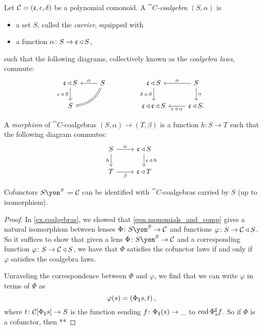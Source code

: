 \documentclass[Book-Poly]{subfiles}
\begin{document}
\begin{definition}\label{def.coalgebra}
Let $\mathcal{C}=(\mathfrak{c},\epsilon,\delta)$ be a polynomial comonoid.
A \emph{$\cat{C}$-coalgebra} $(S,\alpha)$ is
\begin{itemize}
    \item a set $S$, called the \emph{carrier}, equipped with
    \item a function $\alpha\colon S\to\mathfrak{c}\mathbin{\triangleleft} S$,
\end{itemize}
such that the following diagrams, collectively known as the \emph{coalgebra laws}, commute:
\begin{equation} \label{eqn.coalg_laws}
\begin{tikzcd}
	\car{c}\tri S\ar[d, "\epsilon\:\tri\:S"']&
	S\ar[l, "\alpha"']\ar[dl, equal, bend left]\\
	S
\end{tikzcd}
\hspace{.6in}
\begin{tikzcd}
	\car{c}\tri S\ar[d, "\delta\:\tri\:S"']&
	S\ar[l, "\alpha"']\ar[d, "\alpha"]\\
	\car{c}\tri\car{c}\tri S&
	\car{c}\tri S.\ar[l, "\car{c}\:\tri\:\alpha"]
\end{tikzcd}
\end{equation}

A \emph{morphism} of $\cat{C}$-coalgebras $(S,\alpha)\to(T,\beta)$ is a function $h\colon S\to T$ such that the following diagram commutes:
\[
\begin{tikzcd}
    S \ar[d, "h"'] \ar[r, "\alpha"] &
    \car{c}\tri S \ar[d, "\car{c}\:\tri\:h"] \\
    T \ar[r, "\beta"'] &
    \car{c}\tri T
\end{tikzcd}
\]
\end{definition}


\begin{proposition}
Cofunctors $S\yon^S\cof\cat{C}$ can be identified with $\cat{C}$-coalgebras carried by $S$ (up to isomorphism).
\end{proposition}
\begin{proof}
In \cref{ex.coalgebras}, we showed that \eqref{eqn.monomials_and_comp} gives a natural isomorphism between lenses $\Phi\colon S\yon^S\to\cat{C}$ and functions $\varphi\colon S\to\mathcal{C}\mathbin{\triangleleft} S$.
So it suffices to show that given a lens $\Phi\colon S\yon^S\to\cat{C}$ and a corresponding function $\varphi\colon S\to\mathcal{C}\mathbin{\triangleleft} S$, we have that $\Phi$ satisfies the cofunctor laws if and only if $\varphi$ satisfies the coalgebra laws.

Unraveling the correspondence between $\Phi$ and $\varphi$, we find that we can write $\varphi$ in terms of $\Phi$ as
\[
    \varphi(s)=\left(\Phi_{\textsf{1}} s, t\right),
\]
where $t\colon\mathcal{C}[\Phi_{\textsf{1}} s]\to S$ is the function sending $f\colon\Phi_{\textsf{1}}(s)\to\_$ to $\operatorname{cod}\Phi^\sharp_s f$.
So if $\Phi$ is a cofunctor, then
**
\end{proof}
\end{document}
